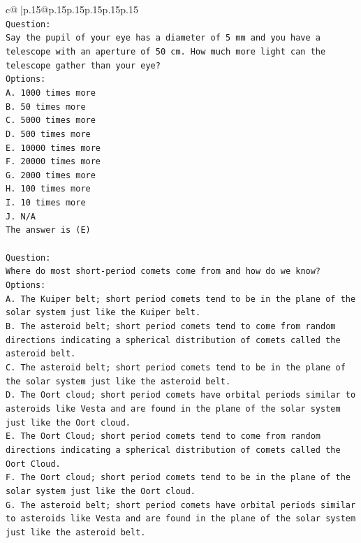 \documentclass{article}
\begin{document}
{\begin{supertabular}{c@{$\;$}|p{.15\linewidth}@{}p{.15\linewidth}p{.15\linewidth}p{.15\linewidth}p{.15\linewidth}p{.15\linewidth}}
{{{\\ 
\texttt{Question:} \\
\texttt{Say the pupil of your eye has a diameter of 5 mm and you have a telescope with an aperture of 50 cm. How much more light can the telescope gather than your eye?} \\
\texttt{Options:} \\
\texttt{A. 1000 times more} \\
\texttt{B. 50 times more} \\
\texttt{C. 5000 times more} \\
\texttt{D. 500 times more} \\
\texttt{E. 10000 times more} \\
\texttt{F. 20000 times more} \\
\texttt{G. 2000 times more} \\
\texttt{H. 100 times more} \\
\texttt{I. 10 times more} \\
\texttt{J. N/A} \\
\texttt{The answer is (E)} \\
\\ 
\texttt{Question:} \\
\texttt{Where do most short{-}period comets come from and how do we know?} \\
\texttt{Options:} \\
\texttt{A. The Kuiper belt; short period comets tend to be in the plane of the solar system just like the Kuiper belt.} \\
\texttt{B. The asteroid belt; short period comets tend to come from random directions indicating a spherical distribution of comets called the asteroid belt.} \\
\texttt{C. The asteroid belt; short period comets tend to be in the plane of the solar system just like the asteroid belt.} \\
\texttt{D. The Oort cloud; short period comets have orbital periods similar to asteroids like Vesta and are found in the plane of the solar system just like the Oort cloud.} \\
\texttt{E. The Oort Cloud; short period comets tend to come from random directions indicating a spherical distribution of comets called the Oort Cloud.} \\
\texttt{F. The Oort cloud; short period comets tend to be in the plane of the solar system just like the Oort cloud.} \\
\texttt{G. The asteroid belt; short period comets have orbital periods similar to asteroids like Vesta and are found in the plane of the solar system just like the asteroid belt.} \\
}}}
\end{supertabular}}
\end{document}
